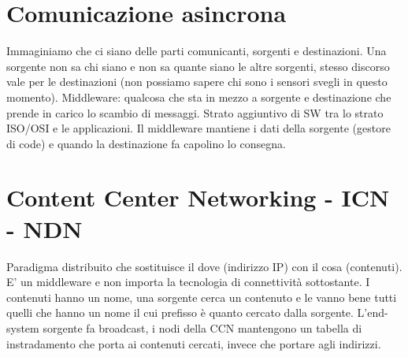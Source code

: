 \documentclass[12pt,italian]{report}
\begin{document}
\section{Comunicazione asincrona}
\label{sec:comasin}
Immaginiamo che ci siano delle parti comunicanti, sorgenti e destinazioni. Una sorgente non sa chi siano e non sa quante siano le altre sorgenti, stesso discorso vale per le destinazioni (non possiamo sapere chi sono i sensori svegli in questo momento). 
\bigbreak
Middleware: qualcosa che sta in mezzo a sorgente e destinazione che prende in carico lo scambio di messaggi. Strato aggiuntivo di SW tra lo strato ISO/OSI e le applicazioni. Il middleware mantiene i dati della sorgente (gestore di code) e quando la destinazione fa capolino lo consegna. 

\section{Content Center Networking - ICN - NDN}
\label{sec:CCN}
Paradigma distribuito che sostituisce il dove (indirizzo IP) con il cosa (contenuti). E' un middleware e non importa la tecnologia di connettività sottostante. 
I contenuti hanno un nome, una sorgente cerca un contenuto e le vanno bene tutti quelli che hanno un nome il cui prefisso è quanto cercato dalla sorgente. L'end-system sorgente fa broadcast, i nodi della CCN mantengono un tabella di instradamento che porta ai contenuti cercati, invece che portare agli indirizzi.
\end{document}

